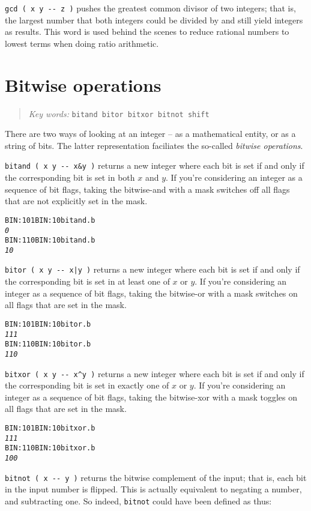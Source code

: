 \documentclass[english]{book}
\newcommand{\chapkeywords}[1]{%
\begin{quote}
\emph{Key words:} \texttt{#1}
\end{quote}
}
\begin{document}
\texttt{gcd ( x y -{}- z )} pushes the greatest common divisor of two integers; that is, the largest number that both integers could be divided by and still yield integers as results. This word is used behind the scenes to reduce rational numbers to lowest terms when doing ratio arithmetic.

\section{Bitwise operations}

\chapkeywords{bitand bitor bitxor bitnot shift}

There are two ways of looking at an integer -- as a mathematical entity, or as a string of bits. The latter representation faciliates the so-called \emph{bitwise operations}.

\texttt{bitand ( x y -{}- x\&y )} returns a new integer where each bit is set if and only if the corresponding bit is set in both $x$ and $y$. If you're considering an integer as a sequence of bit flags, taking the bitwise-and with a mask switches off all flags that are not explicitly set in the mask.

\begin{alltt}
BIN: 101 BIN: 10 bitand .b
\emph{0}
BIN: 110 BIN: 10 bitand .b
\emph{10}
\end{alltt}

\texttt{bitor ( x y -{}- x|y )} returns a new integer where each bit is set if and only if the corresponding bit is set in at least one of $x$ or $y$. If you're considering an integer as a sequence of bit flags, taking the bitwise-or with a mask switches on all flags that are set in the mask.

\begin{alltt}
BIN: 101 BIN: 10 bitor .b
\emph{111}
BIN: 110 BIN: 10 bitor .b
\emph{110}
\end{alltt}

\texttt{bitxor ( x y -{}- x\^{}y )} returns a new integer where each bit is set if and only if the corresponding bit is set in exactly one of $x$ or $y$. If you're considering an integer as a sequence of bit flags, taking the bitwise-xor with a mask toggles on all flags that are set in the mask.

\begin{alltt}
BIN: 101 BIN: 10 bitxor .b
\emph{111}
BIN: 110 BIN: 10 bitxor .b
\emph{100}
\end{alltt}

\texttt{bitnot ( x -{}- y )} returns the bitwise complement of the input; that is, each bit in the input number is flipped. This is actually equivalent to negating a number, and subtracting one. So indeed, \texttt{bitnot} could have been defined as thus:
\end{document}
